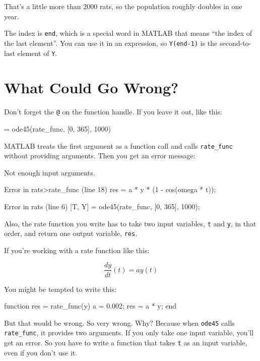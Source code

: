 That's a little more than 2000 rats, so the population roughly doubles in one year.

The index is {\tt end}, which is a special word in MATLAB that means ``the index of the last element''.  You can use it in an expression, so {\tt Y(end-1)} is the second-to-last element of
{\tt Y}.



\section{What Could Go Wrong?}

Don't forget the {\tt @} on the function handle.
If you leave it out, like this:

\begin{code}
[T, Y] = ode45(rate_func, [0, 365], 1000)
\end{code}

MATLAB treats the first argument as a function
call and calls \verb"rate_func" without providing arguments.
Then you get an error message:


\begin{code}
Not enough input arguments.

Error in rats>rate_func (line 18)
    res = a * y * (1 - cos(omega * t));

Error in rats (line 6)
    [T, Y] = ode45(rate_func, [0, 365], 1000);
\end{code}

Also, the rate function you write has to take two input variables, 
{\tt t} and {\tt y}, in that order, and return one output variable, 
{\tt res}.


If you're working with a rate function like this:

\begin{equation}
\frac{dy}{dt}(t) = a y(t)
\end{equation}

You might be tempted to write this:

\begin{code}
function res = rate_func(y)        %
    a = 0.002;
    res = a * y;
end
\end{code}

But that would be wrong.  So very wrong.  Why?  Because
when {\tt ode45} calls \verb"rate_func", it provides two arguments.
If you only take one input variable, you'll get an error.  So
you have to write a function that takes {\tt t} as an input
variable, even if you don't use it.

